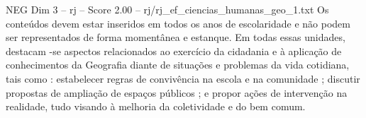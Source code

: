\begin{textsample}{NEG Dim 3 – rj – Score 2.00 – rj/rj\_ef\_ciencias\_humanas\_geo\_1.txt}
Os conteúdos devem estar inseridos em todos os anos de escolaridade e não podem ser representados de forma momentânea e estanque.
Em todas essas unidades, destacam -se aspectos relacionados ao exercício da cidadania e à aplicação de conhecimentos da Geografia diante de situações e problemas da vida cotidiana, tais como : estabelecer regras de convivência na escola e na comunidade ; discutir propostas de ampliação de espaços públicos ; e propor ações de intervenção na realidade, tudo visando à melhoria da coletividade e do bem comum.

\end{textsample}
